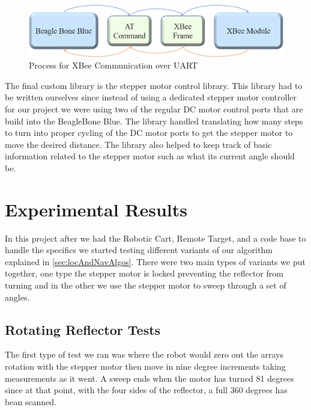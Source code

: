 \begin{figure}[H]
  \centering
  \includegraphics[width=\textwidth]{figs/img/Command Process Diagram.png}
  \caption{Process for XBee Communication over UART}
  \label{fig:CommandProcessDiagram}
\end{figure}

\vspace*{12pt}
\noindent
The final custom library is the stepper motor control library. This library had to be written ourselves since instead of using a dedicated stepper motor controller for our project we were using two of the regular DC motor control ports that are build into the BeagleBone Blue. The library handled translating how many steps to turn into proper cycling of the DC motor ports to get the stepper motor to move the desired distance.  The library also helped to keep track of basic information related to the stepper motor such as what its current angle should be.

\section{Experimental Results}
\label{sec:Experimental Results}

In this project after we had the Robotic Cart, Remote Target, and a code base to handle the specifics we started testing different variants of our algorithm explained in \autoref{sec:locAndNavAlgos}. There were two main types of variants we put together, one type the stepper motor is locked preventing the reflector from turning and in the other we use the stepper motor to sweep through a set of angles.

\subsection{Rotating Reflector Tests}

The first type of test we ran was where the robot would zero out the arrays rotation with the stepper motor then move in nine degree increments taking measurements as it went. A sweep ends when the motor has turned 81 degrees since at that point, with the four sides of the reflector, a full 360 degrees has bean scanned.


